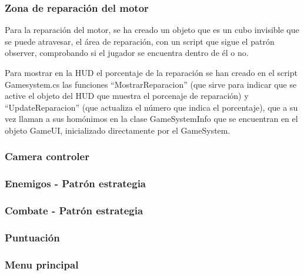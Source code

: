 \subsubsection{Zona de reparación del motor}
Para la reparación del motor, se ha creado un objeto que es un cubo invisible que se puede atravesar, el área de reparación, con un script que sigue el patrón observer, comprobando si el jugador se encuentra dentro de él o no. 

Para mostrar en la HUD el porcentaje de la reparación se han creado en el script Gamesystem.cs las funciones “MostrarReparacion” (que sirve para indicar que se active el objeto del HUD que muestra el porcenaje de reparación) y “UpdateReparacion” (que actualiza el número que indica el porcentaje), que a su vez llaman a sus homónimos en la clase GameSystemInfo que se encuentran en el objeto GameUI, inicializado directamente por el GameSystem. 

\subsubsection{Camera controler}

\subsubsection{Enemigos - Patrón estrategia}

\subsubsection{Combate - Patrón estrategia}

\subsubsection{Puntuación}

\subsubsection{Menu principal}






